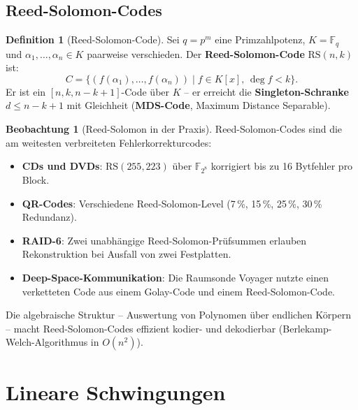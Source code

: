 ﻿\documentclass[a4paper,12pt]{report}
\theoremstyle{definition}
\newtheorem{definition}{Definition}
\newtheorem{beobachtung}{Beobachtung}
\begin{document}

\section{Reed-Solomon-Codes}

\begin{definition}[Reed-Solomon-Code]
    Sei $q = p^m$ eine Primzahlpotenz, $K = \mathbb{F}_q$ und
    $\alpha_1, \ldots, \alpha_n \in K$ paarweise verschieden.
    Der \textbf{Reed-Solomon-Code} $\mathrm{RS}(n, k)$ ist:
    \[
        C = \{(f(\alpha_1), \ldots, f(\alpha_n)) \mid f \in K[x],\,\deg f < k\}.
    \]
    Er ist ein $[n, k, n-k+1]$-Code über $K$ -- er erreicht die
    \textbf{Singleton-Schranke} $d \leq n - k + 1$ mit Gleichheit
    (\textbf{MDS-Code}, Maximum Distance Separable).
\end{definition}

\begin{beobachtung}[Reed-Solomon in der Praxis]
    Reed-Solomon-Codes sind die am weitesten verbreiteten Fehlerkorrekturcodes:
    \begin{itemize}
        \item[-] \textbf{CDs und DVDs}: $\mathrm{RS}(255, 223)$ über
              $\mathbb{F}_{2^8}$ korrigiert bis zu 16 Bytfehler pro Block.
        \item[-] \textbf{QR-Codes}: Verschiedene Reed-Solomon-Level
              (7\,\%, 15\,\%, 25\,\%, 30\,\% Redundanz).
        \item[-] \textbf{RAID-6}: Zwei unabhängige Reed-Solomon-Prüfsummen
              erlauben Rekonstruktion bei Ausfall von zwei Festplatten.
        \item[-] \textbf{Deep-Space-Kommunikation}: Die Raumsonde
              Voyager nutzte einen verketteten Code aus einem
              Golay-Code und einem Reed-Solomon-Code.
    \end{itemize}
    Die algebraische Struktur -- Auswertung von Polynomen über
    endlichen Körpern -- macht Reed-Solomon-Codes effizient
    kodier- und dekodierbar (Berlekamp-Welch-Algorithmus in $O(n^2)$).
\end{beobachtung}

\chapter{Lineare Schwingungen}
\end{document}
